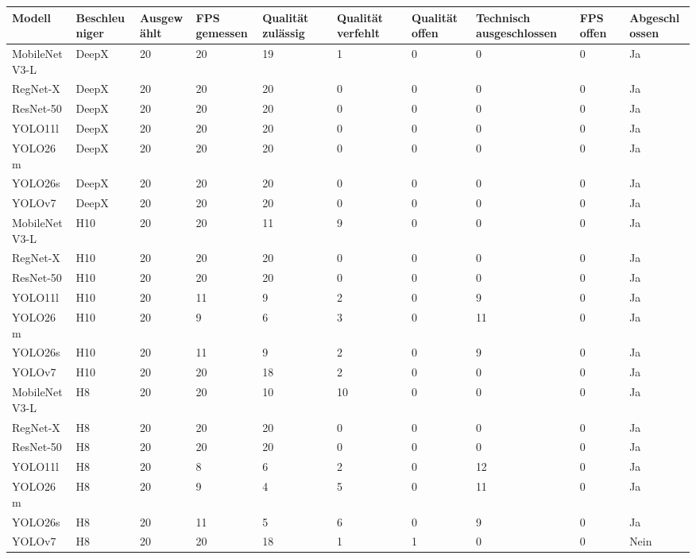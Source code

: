\begin{tabular}{@{}llllllllll@{}}
\toprule
Modell & Beschleuniger & Ausgewählt & FPS gemessen & Qualität zulässig & Qualität verfehlt & Qualität offen & Technisch ausgeschlossen & FPS offen & Abgeschlossen \\
\midrule
MobileNetV3-L & DeepX & 20 & 20 & 19 & 1 & 0 & 0 & 0 & Ja \\
RegNet-X & DeepX & 20 & 20 & 20 & 0 & 0 & 0 & 0 & Ja \\
ResNet-50 & DeepX & 20 & 20 & 20 & 0 & 0 & 0 & 0 & Ja \\
YOLO11l & DeepX & 20 & 20 & 20 & 0 & 0 & 0 & 0 & Ja \\
YOLO26m & DeepX & 20 & 20 & 20 & 0 & 0 & 0 & 0 & Ja \\
YOLO26s & DeepX & 20 & 20 & 20 & 0 & 0 & 0 & 0 & Ja \\
YOLOv7 & DeepX & 20 & 20 & 20 & 0 & 0 & 0 & 0 & Ja \\
MobileNetV3-L & H10 & 20 & 20 & 11 & 9 & 0 & 0 & 0 & Ja \\
RegNet-X & H10 & 20 & 20 & 20 & 0 & 0 & 0 & 0 & Ja \\
ResNet-50 & H10 & 20 & 20 & 20 & 0 & 0 & 0 & 0 & Ja \\
YOLO11l & H10 & 20 & 11 & 9 & 2 & 0 & 9 & 0 & Ja \\
YOLO26m & H10 & 20 & 9 & 6 & 3 & 0 & 11 & 0 & Ja \\
YOLO26s & H10 & 20 & 11 & 9 & 2 & 0 & 9 & 0 & Ja \\
YOLOv7 & H10 & 20 & 20 & 18 & 2 & 0 & 0 & 0 & Ja \\
MobileNetV3-L & H8 & 20 & 20 & 10 & 10 & 0 & 0 & 0 & Ja \\
RegNet-X & H8 & 20 & 20 & 20 & 0 & 0 & 0 & 0 & Ja \\
ResNet-50 & H8 & 20 & 20 & 20 & 0 & 0 & 0 & 0 & Ja \\
YOLO11l & H8 & 20 & 8 & 6 & 2 & 0 & 12 & 0 & Ja \\
YOLO26m & H8 & 20 & 9 & 4 & 5 & 0 & 11 & 0 & Ja \\
YOLO26s & H8 & 20 & 11 & 5 & 6 & 0 & 9 & 0 & Ja \\
YOLOv7 & H8 & 20 & 20 & 18 & 1 & 1 & 0 & 0 & Nein \\
\bottomrule
\end{tabular}
